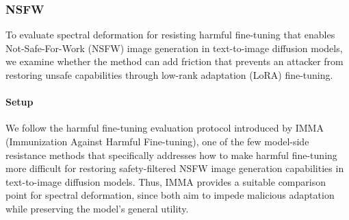 \documentclass{article}
\theoremstyle{plain}
\theoremstyle{definition}
\theoremstyle{remark}
\begin{document}

\subsubsection{NSFW}
To evaluate spectral deformation for resisting harmful fine-tuning that enables Not-Safe-For-Work (NSFW) image generation in text-to-image diffusion models, we examine whether the method can add friction that prevents an attacker from restoring unsafe capabilities through low-rank adaptation (LoRA) fine-tuning.

\paragraph{Setup} We follow the harmful fine-tuning evaluation protocol introduced by IMMA \citep{zheng2024imma} (Immunization Against Harmful Fine-tuning), one of the few model-side resistance methods that specifically addresses how to make harmful fine-tuning more difficult for restoring safety-filtered NSFW image generation capabilities in text-to-image diffusion models. Thus, IMMA provides a suitable comparison point for spectral deformation, since both aim to impede malicious adaptation while preserving the model's general utility.
\end{document}
